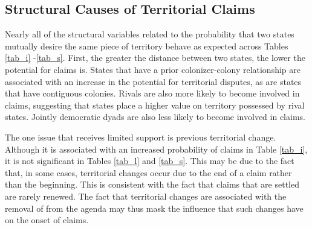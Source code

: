 
\subsection{Structural Causes of Territorial Claims}
\begin{comment}
distance decreases
terrchange increases
former colony increases
colonial contiguity is posjibve
majorminor dyad increaes
major major increaes
defense null io
jointdem decrease
rivalry increaess

Solschange
terrch insig
defense decreases in m1, not 2

Leadchange
terrch insig
defensive alliance sig in 1, not 2
\end{comment}

Nearly all of the structural variables related to the probability that two states mutually desire the same piece of territory behave as expected across Tables \ref{tab_i} \hyphen \ref{tab_s}. First, the greater the distance between two states, the lower the potential for claims is. States that have a prior colonizer-colony relationship are associated with an increase in the potential for territorial disputes, as are states that have contiguous colonies. Rivals are also more likely to become involved in claims, suggesting that states place a higher value on territory possessed by rival states. Jointly democratic dyads are also less likely to become involved in claims. 

The one issue that receives limited support is previous territorial change. Although it is associated with an increased probability of claims in Table \ref{tab_i}, it is not significant in Tables \ref{tab_l} and \ref{tab_s}. This may be due to the fact that, in some cases, territorial changes occur due to the end of a claim rather than the beginning. This is consistent with the fact that claims that are settled are rarely renewed. The fact that territorial changes are associated with the removal of  from the agenda may thus mask the influence that such changes have on the onset of claims.

